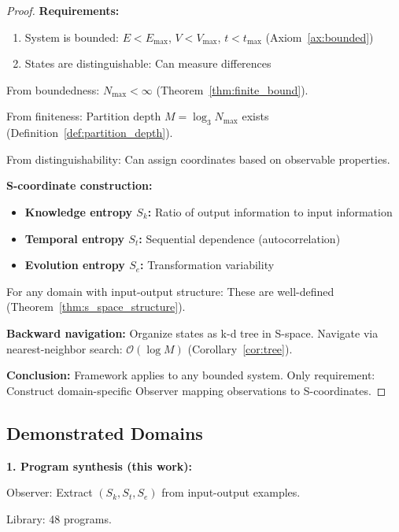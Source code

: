 \documentclass[twocolumn,10pt]{article}
\theoremstyle{definition}
\theoremstyle{remark}
\newcommand{\Sk}{S_k}
\newcommand{\St}{S_t}
\newcommand{\Se}{S_e}
\newcommand{\Nmax}{N_{\max}}
\newcommand{\bigO}{\mathcal{O}}
\begin{document}
\begin{proof}
\textbf{Requirements:}
\begin{enumerate}
\item System is bounded: $E < E_{\max}$, $V < V_{\max}$, $t < t_{\max}$ (Axiom~\ref{ax:bounded})
\item States are distinguishable: Can measure differences
\end{enumerate}

From boundedness: $\Nmax < \infty$ (Theorem~\ref{thm:finite_bound}).

From finiteness: Partition depth $M = \log_3 \Nmax$ exists (Definition~\ref{def:partition_depth}).

From distinguishability: Can assign coordinates based on observable properties.

\vspace{0.2cm}
\noindent\textbf{S-coordinate construction:}
\begin{itemize}
\item \textbf{Knowledge entropy $\Sk$:} Ratio of output information to input information
\item \textbf{Temporal entropy $\St$:} Sequential dependence (autocorrelation)
\item \textbf{Evolution entropy $\Se$:} Transformation variability
\end{itemize}

For any domain with input-output structure: These are well-defined (Theorem~\ref{thm:s_space_structure}).

\vspace{0.2cm}
\noindent\textbf{Backward navigation:} Organize states as k-d tree in S-space. Navigate via nearest-neighbor search: $\bigO(\log M)$ (Corollary~\ref{cor:tree}).

\vspace{0.2cm}
\noindent\textbf{Conclusion:} Framework applies to any bounded system. Only requirement: Construct domain-specific Observer mapping observations to S-coordinates.
\end{proof}

\subsection{Demonstrated Domains}

\textbf{1. Program synthesis (this work):}

Observer: Extract $(\Sk, \St, \Se)$ from input-output examples.

Library: 48 programs.
\end{document}
